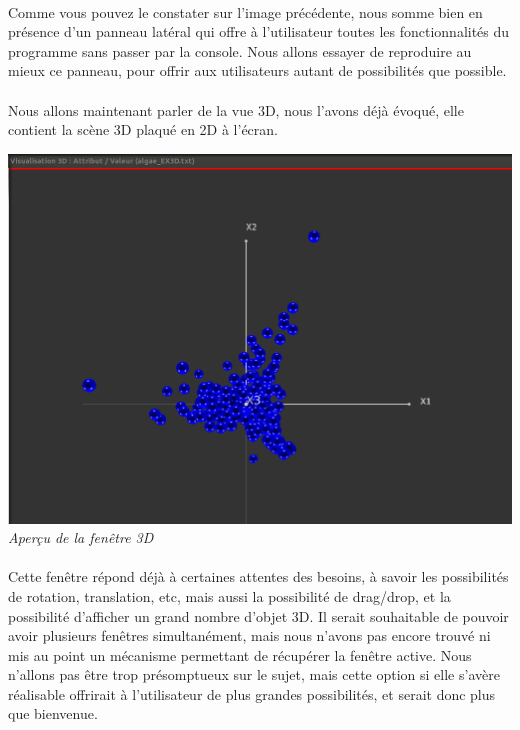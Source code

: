 \paragraph{} Comme vous pouvez le constater sur l'image précédente, nous somme bien en présence d'un panneau latéral qui offre à l'utilisateur toutes les fonctionnalités du programme sans passer par la console. Nous allons essayer de reproduire au mieux ce panneau, pour offrir aux utilisateurs autant de possibilités que possible.

\paragraph{} Nous allons maintenant parler de la vue 3D, nous l'avons déjà évoqué, elle contient la scène 3D plaqué en 2D à l'écran.\\

\begin{center}
\includegraphics[scale=0.5]{vue3D.png}\\
\textit{Aperçu de la fenêtre 3D}\\
\end{center}

\paragraph{} Cette fenêtre répond déjà à certaines attentes des besoins, à savoir les possibilités de rotation, translation, etc, mais aussi la possibilité de drag/drop, et la possibilité d'afficher un grand nombre d'objet 3D. Il serait souhaitable de pouvoir avoir plusieurs fenêtres simultanément, mais nous n'avons pas encore trouvé ni mis au point un mécanisme permettant de récupérer la fenêtre active. Nous n'allons pas être trop présomptueux sur le sujet, mais cette option si elle s'avère réalisable offrirait à l'utilisateur de plus grandes possibilités, et serait donc plus que bienvenue.
\newpage